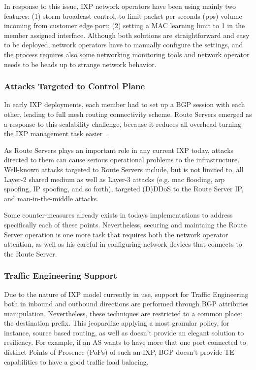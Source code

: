 \documentclass[conference]{IEEEtran/IEEEtran}
\begin{document}
In response to this issue, IXP network operators have been using mainly two features: (1) storm broadcast control, to limit packet per seconds (pps) volume incoming from customer edge port; (2) setting a MAC learning limit to 1 in the member assigned interface. Although both solutions are straightforward and easy to be deployed, network operators have to manually configure the settings, and the process requires also some networking monitoring tools and network operator needs to be heads up to strange network behavior.

\subsubsection{Attacks Targeted to Control Plane}
In early IXP deployments, each member had to set up a BGP session with each other, leading to full mesh routing connectivity scheme. Route Servers emerged as a response to this scalability challenge, because it reduces all overhead turning the IXP management task easier~\cite{lu2005networking}.

As Route Servers plays an important role in any current IXP today, attacks directed to them can cause serious operational problems to the infrastructure. Well-known attacks targeted to Route Servers include, but is not limited to, all Layer-2 shared medium as well as Layer-3 attacks (e.g. mac flooding, arp spoofing, IP spoofing, and so forth), targeted (D)DDoS to the Route Server IP, and man-in-the-middle attacks.

Some counter-measures already exists in todays implementations to address specifically each of these points. Nevertheless, securing and maintaing the Route Server operation is one more task that requires both the network operator attention, as well as his careful in configuring network devices that connects to the Route Server.

\subsubsection{Traffic Engineering Support}
Due to the nature of IXP model currently in use, support for Traffic Engineering both in inbound and outbound directions are performed through BGP attributes manipulation. Nevertheless, these techniques are restricted to a common place: the destination prefix. This jeopardize applying a most granular policy, for instance, source based routing, as well as doesn't provide an elegant solution to resiliency. For example, if an AS wants to have more that one port connected to distinct Points of Prosence (PoPs) of such an IXP, BGP doesn't provide TE capabilities to have a good traffic load balacing.
\end{document}
